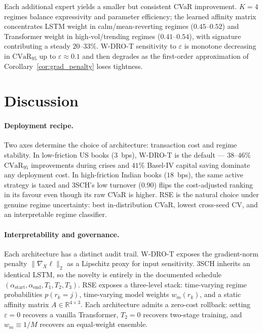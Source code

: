 \documentclass[11pt]{article}
\newcommand{\cvar}{\mathrm{CVaR}}
\newcommand{\R}{\mathbb{R}}
\begin{document}
Each additional expert yields a smaller but consistent CVaR improvement.  $K=4$ regimes balance expressivity and parameter efficiency; the learned affinity matrix concentrates LSTM weight in calm/mean-reverting regimes ($0.45$--$0.52$) and Transformer weight in high-vol/trending regimes ($0.41$--$0.54$), with signature contributing a steady $20$--$33\%$.  W-DRO-T sensitivity to $\varepsilon$ is monotone decreasing in $\cvar_{95}$ up to $\varepsilon\approx 0.1$ and then degrades as the first-order approximation of Corollary~\ref{cor:grad_penalty} loses tightness.

\section{Discussion}\label{sec:discussion}

\paragraph{Deployment recipe.}  Two axes determine the choice of architecture: transaction cost and regime stability.  In low-friction US books ($3$~bps), W-DRO-T is the default --- $38$--$46\%$ $\cvar_{95}$ improvements during crises and $41\%$ Basel-IV capital saving dominate any deployment cost.  In high-friction Indian books ($18$~bps), the same active strategy is taxed and 3SCH's low turnover ($0.90$) flips the cost-adjusted ranking in its favour even though its raw CVaR is higher.  RSE is the natural choice under genuine regime uncertainty: best in-distribution CVaR, lowest cross-seed CV, and an interpretable regime classifier.

\paragraph{Interpretability and governance.}  Each architecture has a distinct audit trail.  W-DRO-T exposes the gradient-norm penalty $\|\nabla_X\ell\|_2$ as a Lipschitz proxy for input sensitivity.  3SCH inherits an identical LSTM, so the novelty is entirely in the documented schedule $(\alpha_{\mathrm{start}},\alpha_{\mathrm{end}},T_1,T_2,T_3)$.  RSE exposes a three-level stack: time-varying regime probabilities $p(r_k=j)$, time-varying model weights $w_m(r_k)$, and a static affinity matrix $A\in\R^{4\times 3}$.  Each architecture admits a zero-cost rollback: setting $\varepsilon=0$ recovers a vanilla Transformer, $T_2=0$ recovers two-stage training, and $w_m\equiv 1/M$ recovers an equal-weight ensemble.
\end{document}
